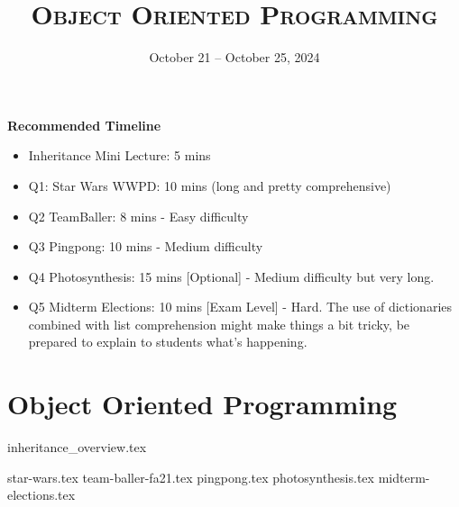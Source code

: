 \documentclass{exam}
\title{\textsc{Object Oriented Programming}}
\date{October 21 -- October 25, 2024}
\begin{document}
\maketitle
\begin{guide}
    \textbf{Recommended Timeline}
    \begin{itemize}
       \item Inheritance Mini Lecture: 5 mins
       \item Q1: Star Wars WWPD: 10 mins (long and pretty comprehensive)
       \item Q2 TeamBaller: 8 mins - Easy difficulty
       \item Q3 Pingpong: 10 mins - Medium difficulty
       \item Q4 Photosynthesis: 15 mins [Optional] - Medium difficulty but very long.
       \item Q5 Midterm Elections: 10 mins [Exam Level] - Hard. The use of dictionaries combined with list comprehension might make things a bit tricky, be prepared to explain to students what's happening.
    \end{itemize}
\end{guide}


\section{Object Oriented Programming}
{inheritance_overview.tex}


\begin{questions}
    {star-wars.tex}
    {team-baller-fa21.tex}
    {pingpong.tex}
    {photosynthesis.tex}
    {midterm-elections.tex}
\end{questions}
\end{document}
